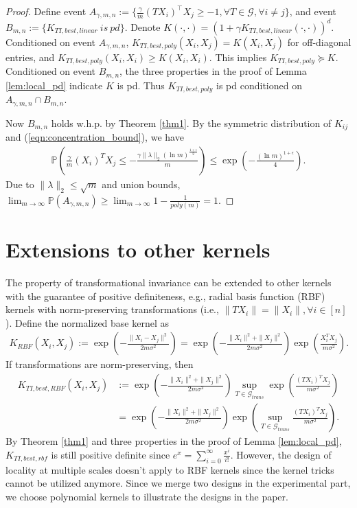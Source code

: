 \documentclass{article}
\theoremstyle{plain}
\theoremstyle{definition}
\theoremstyle{remark}
\begin{document}
\begin{proof}
Define event $A_{\gamma,m,n} := \{\frac{\gamma}{m}(TX_i)^\top X_j \geq -1,\forall T \in \mathcal{G}, \forall i \not= j\}$, and event $B_{m,n} := \{K_{TI,best,linear}{~is~pd}\}$. Denote $K(\cdot,\cdot) = (1 + \gamma K_{TI,best,linear}(\cdot, \cdot))^d$. Conditioned on event $A_{\gamma, m,n}$, $K_{TI,best,poly}(X_i,X_j) = K(X_i,X_j)$ for off-diagonal entries, and $K_{TI,best,poly}(X_i, X_i) \geq K(X_i, X_i)$. This implies $K_{TI,best,poly} \succeq K$. Conditioned on event $B_{m,n}$, the three properties in the proof of Lemma \ref{lem:local_pd} indicate $K$ is pd. Thus $K_{TI,best,poly}$ is pd conditioned on $A_{\gamma,m,n} \cap B_{m,n}$. 
 
Now $B_{m,n}$ holds w.h.p. by Theorem \ref{thm1}. By the symmetric distribution of $K_{ij}$ and (\ref{eqn:concentration_bound}), we have
\begin{align*}
    \mathbb{P}(\frac{\gamma}{m} (X_i)^T X_j \leq -\frac{\gamma \|\lambda\|_2 (\ln m)^{\frac{1+\epsilon}{2}}}{m}) \leq \exp(-\frac{(\ln m)^{1+\epsilon}}{4}).
\end{align*}
Due to $\|\lambda\|_2 \leq \sqrt{m}$ and union bounds, $\lim_{m \to \infty} \mathbb{P}(A_{\gamma, m, n}) \geq \lim_{m \to \infty} 1 - \frac{1}{poly(m)} = 1.$
\end{proof}



\section{Extensions to other kernels}
The property of transformational invariance can be extended to other kernels with the guarantee of positive definiteness, e.g., radial basis function (RBF) kernels with norm-preserving transformations (i.e., $\|T X_i\| = \|X_i\|, \forall i \in [n]$). Define the normalized base kernel as
    \begin{align*}
        K_{RBF}(X_i, X_j) := \exp(-\frac{\|X_i - X_j\|^2}{2 m \sigma^2}) = \exp(-\frac{\|X_i\|^2 + \|X_j\|^2}{2 m \sigma^2}) \exp(\frac{X_i^T X_j}{ m \sigma^2}).
    \end{align*}
    If transformations are norm-preserving, then
    \begin{align*}
        K_{TI, best, RBF}(X_i, X_j) &:= \exp(-\frac{\|X_i\|^2 + \|X_j\|^2}{2 m \sigma^2}) \sup_{T \in \mathcal{G}_{trans}} \exp(\frac{(T X_i)^T X_j}{m \sigma^2}) \\
        &= \exp(-\frac{\|X_i\|^2 + \|X_j\|^2}{2 m \sigma^2}) \exp(\sup_{T \in \mathcal{G}_{trans}} \frac{(T X_i)^T X_j}{ m \sigma^2}).
    \end{align*}
    By Theorem \ref{thm1} and three properties in the proof of Lemma \ref{lem:local_pd}, $K_{TI, best, rbf}$ is still positive definite since $e^x = \sum_{i=0}^{\infty} \frac{x^i}{i!}$. However, the design of locality at multiple scales doesn't apply to RBF kernels since the kernel tricks cannot be utilized anymore. Since we merge two designs in the experimental part, we choose polynomial kernels to illustrate the designs in the paper. 
\end{document}
